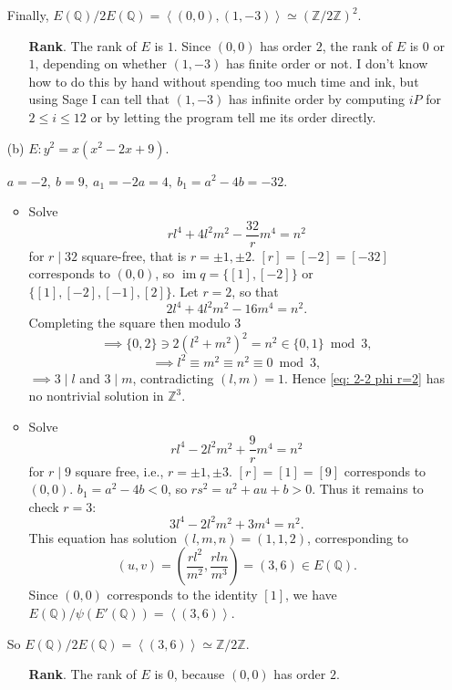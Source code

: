 \documentclass{article}
\theoremstyle{definition}
\theoremstyle{remark}
\newcommand{\Q}{\mathbb{Q}}
\newcommand{\Z}{\mathbb{Z}}
\DeclareMathOperator{\im}{im} %
\newcommand{\gene}[1]{\left\langle #1 \right\rangle} %
\begin{document}
\begin{enumerate}
Finally, $E(\Q)/2E(\Q) = \gene{(0, 0), (1,-3)}\simeq \left( \Z/2\Z \right)^2$.
\begin{itemize}
\item [\textbf{Rank}.]
The rank of $E$ is $1$.
Since $(0, 0)$ has order $2$,
the rank of $E$ is $0$ or $1$, depending on whether $(1, -3)$ has finite order or not.
I don't know how to do this by hand without spending too much time and ink, but using Sage I can tell that $(1, -3)$ has infinite order by computing $iP$ for $2\le i\le 12$ or by letting the program tell me its order directly.

\end{itemize}


\item [(b)] $E:y^2=x(x^2-2x+9)$.\par
$a = -2,\ b = 9,\ a_1 = -2a = 4,\ b_1 = a^2 - 4b = -32$.
\begin{itemize}
\item Solve \begin{equation}
    rl^4 + 4l^2m^2  - \frac{32}{r} m^4 = n^2
\end{equation}
for $r\mid 32$ square-free, that is $r = \pm1, \pm2$. $[r] = [-2] = [-32]$ corresponds to $(0, 0)$,
so $\im q = \{[1], [-2]\}$ or $\{[1], [-2], [-1], [2]\}$.
Let $r = 2$, so that \begin{equation}\label{eq: 2-2 phi r=2}
    2l^4 + 4l^2m^2 - 16m^4 = n^2.
\end{equation}
Completing the square then modulo $3$
\[\implies\{0, 2\}\ni 2(l^2 + m^2)^2 = n^2 \in \{0, 1\}\bmod 3,\]
\[\implies l^2\equiv m^2\equiv n^2\equiv 0\bmod 3,\]
$\implies 3\mid l$ and $3\mid m$, contradicting $(l, m) = 1$.
Hence \cref{eq: 2-2 phi r=2} has no nontrivial solution in $\Z^3$.
\item Solve\begin{equation}
    rl^4 - 2l^2m^2 + \frac{9}{r}m^4 = n^2
\end{equation}
for $r\mid 9$ square free, i.e., $r = \pm1, \pm 3$.
$[r] = [1] = [9]$ corresponds to $(0, 0)$.
$b_1 = a^2 - 4b < 0$,
so $rs^2 = u^2 + au + b > 0$.
Thus it remains to check $r = 3$:
\begin{equation}
    3l^4 - 2l^2m^2 + 3m^4 = n^2.
\end{equation}
This equation has solution $(l,m,n) = (1,1,2)$,
corresponding to \[(u, v) = \left( \frac{rl^2}{m^2},\frac{rln}{m^3} \right) = (3, 6)\in E(\Q).\]
Since $(0, 0)$ corresponds to the identity $[1]$, we have $E(\Q)/\psi(E'(\Q)) = \gene{(3, 6)}$.
\end{itemize}
So $E(\Q)/2E(\Q) = \gene{(3, 6)}\simeq\Z/2\Z$.
\begin{itemize}
\item [\textbf{Rank}.]
The rank of $E$ is $0$, because $(0, 0)$ has order $2$.
\end{itemize}


\end{enumerate}
\end{document}
